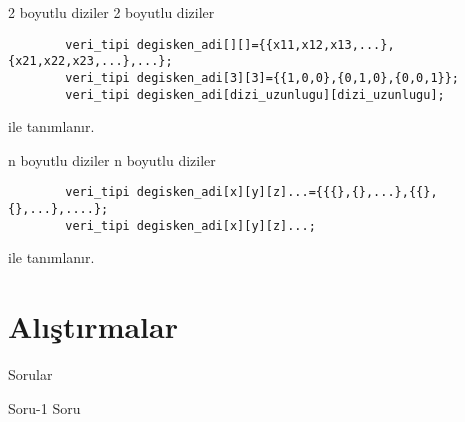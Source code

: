 \begin{frame}[fragile]{2 boyutlu diziler}
    2 boyutlu diziler
    \begin{lstlisting}
        veri_tipi degisken_adi[][]={{x11,x12,x13,...},{x21,x22,x23,...},...};
        veri_tipi degisken_adi[3][3]={{1,0,0},{0,1,0},{0,0,1}};
        veri_tipi degisken_adi[dizi_uzunlugu][dizi_uzunlugu];
    \end{lstlisting}
    ile tanımlanır.
\end{frame}
\begin{frame}[fragile]{n boyutlu diziler}
    n boyutlu diziler
    \begin{lstlisting}
        veri_tipi degisken_adi[x][y][z]...={{{},{},...},{{},{},...},....};
        veri_tipi degisken_adi[x][y][z]...;
    \end{lstlisting}
    ile tanımlanır.
\end{frame}

\section{Alıştırmalar}
\begin{frame}[fragile]{Sorular}
    \begin{alertblock}{Soru-1}
        Soru
    \end{alertblock}
\end{frame}
